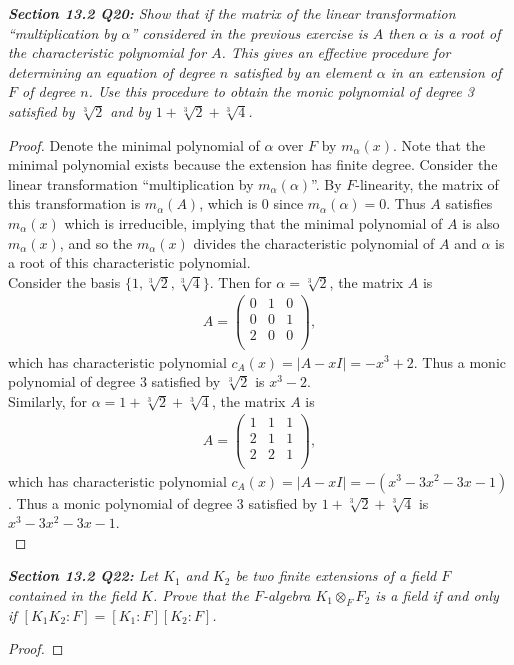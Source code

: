 \documentclass{article}
\begin{document}
\it \textbf{Section 13.2 Q20:} Show that if the matrix of the linear
  transformation ``multiplication by $\alpha$'' considered in the previous
  exercise is $A$ then $\alpha$ is a root of the characteristic polynomial
  for $A$. This gives an effective procedure for determining an equation of
  degree $n$ satisfied by an element $\alpha$ in an extension of $F$ of
  degree $n$. Use this procedure to obtain the monic polynomial of degree 3
  satisfied by $\sqrt[3]{2}$ and by $1+\sqrt[3]{2}+\sqrt[3]{4}$.

  \begin{proof}
    Denote the minimal polynomial of $\alpha$ over $F$ by $m_\alpha(x)$.
    Note that the minimal polynomial exists because the extension has
    finite degree. Consider the linear transformation ``multiplication by
    $m_\alpha(\alpha)$''. By $F$-linearity, the matrix of this
    transformation is $m_\alpha(A)$, which is 0 since $m_\alpha(\alpha)=0$.
    Thus $A$ satisfies $m_\alpha(x)$ which is irreducible, implying that
    the minimal polynomial of $A$ is also $m_\alpha(x)$, and so the
    $m_\alpha(x)$ divides the characteristic polynomial of $A$ and $\alpha$
    is a root of this characteristic polynomial. \\

    Consider the basis $\{1,\sqrt[3]{2},\sqrt[3]{4}\}$. Then for
    $\alpha=\sqrt[3]{2}$, the matrix $A$ is
    \begin{align*}
      A =
      \begin{pmatrix}
        0&1&0\\
        0&0&1\\
        2&0&0\\
      \end{pmatrix},
    \end{align*}
    which has characteristic polynomial $c_A(x)=|A-xI|=-x^3+2$. Thus a
    monic polynomial of degree 3 satisfied by $\sqrt[3]{2}$ is $x^3-2$. \\

    Similarly, for $\alpha=1+\sqrt[3]{2}+\sqrt[3]{4}$, the matrix $A$ is
    \begin{align*}
      A =
      \begin{pmatrix}
        1&1&1\\
        2&1&1\\
        2&2&1\\
      \end{pmatrix},
    \end{align*}
    which has characteristic polynomial $c_A(x)=|A-xI|=-(x^3-3x^2-3x-1)$.
    Thus a monic polynomial of degree 3 satisfied by
    $1+\sqrt[3]{2}+\sqrt[3]{4}$ is $x^3-3x^2-3x-1$. \\
  \end{proof}

\it \textbf{Section 13.2 Q22:} Let $K_1$ and $K_2$ be two finite extensions
  of a field $F$ contained in the field $K$. Prove that the $F$-algebra
  $K_1\otimes_F F_2$ is a field if and only if $[K_1K_2:F]=[K_1:F][K_2:F]$.

  \begin{proof}
  \end{proof}
\end{document}
